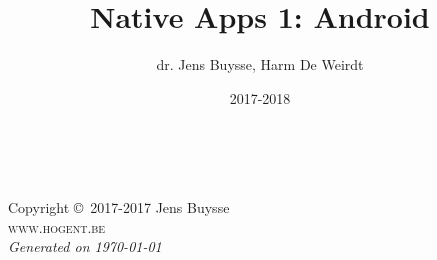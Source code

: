 \documentclass[11pt,fleqn,a4paper]{book}
\author{dr. Jens Buysse, Harm De Weirdt}
\title{Native Apps 1: Android}
\date{2017-2018}
\begin{document}
\thetitlepage


\newpage
~\vfill
\thispagestyle{empty}

\noindent Copyright \copyright\ 2017-2017 Jens Buysse\\ %

\noindent \textsc{www.hogent.be}\\ %

\noindent \textit{Generated on \today} %



\tableofcontents %

\printglossaries

\cleardoublepage %

\setlength{\parindent}{0pt}





















\printbibliography

\printindex
\end{document}
